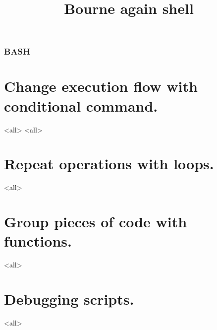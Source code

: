 
\title[bash]{Bourne again shell}




\begin{frame}
	\frametitle{BASH}
	\titlepage
	\vspace{-0.5cm}
	\begin{center}
	\end{center}
\end{frame}

\begin{frame}
	\tableofcontents
\end{frame}





\section{Change execution flow with conditional command.}
\mode<all>{}
\mode<all>{}

\section{Repeat operations with loops.}
\mode<all>{}

\section{Group pieces of code with functions.}
\mode<all>{}

\section{Debugging scripts.}
\mode<all>{}


